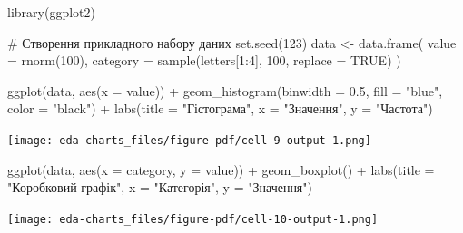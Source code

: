 \documentclass[
  letterpaper,
  DIV=11,
  numbers=noendperiod]{scrreprt}
\newenvironment{Shaded}{\begin{snugshade}}{\end{snugshade}}
\newcommand{\AttributeTok}[1]{\textcolor[rgb]{0.40,0.45,0.13}{#1}}
\newcommand{\CommentTok}[1]{\textcolor[rgb]{0.37,0.37,0.37}{#1}}
\newcommand{\ConstantTok}[1]{\textcolor[rgb]{0.56,0.35,0.01}{#1}}
\newcommand{\DecValTok}[1]{\textcolor[rgb]{0.68,0.00,0.00}{#1}}
\newcommand{\FloatTok}[1]{\textcolor[rgb]{0.68,0.00,0.00}{#1}}
\newcommand{\FunctionTok}[1]{\textcolor[rgb]{0.28,0.35,0.67}{#1}}
\newcommand{\NormalTok}[1]{\textcolor[rgb]{0.00,0.23,0.31}{#1}}
\newcommand{\OtherTok}[1]{\textcolor[rgb]{0.00,0.23,0.31}{#1}}
\newcommand{\SpecialCharTok}[1]{\textcolor[rgb]{0.37,0.37,0.37}{#1}}
\newcommand{\StringTok}[1]{\textcolor[rgb]{0.13,0.47,0.30}{#1}}
\begin{document}
\begin{Shaded}
\begin{Highlighting}[]
\FunctionTok{library}\NormalTok{(ggplot2)}

\CommentTok{\# Створення прикладного набору даних}
\FunctionTok{set.seed}\NormalTok{(}\DecValTok{123}\NormalTok{)}
\NormalTok{data }\OtherTok{\textless{}{-}} \FunctionTok{data.frame}\NormalTok{(}
  \AttributeTok{value =} \FunctionTok{rnorm}\NormalTok{(}\DecValTok{100}\NormalTok{),}
  \AttributeTok{category =} \FunctionTok{sample}\NormalTok{(letters[}\DecValTok{1}\SpecialCharTok{:}\DecValTok{4}\NormalTok{], }\DecValTok{100}\NormalTok{, }\AttributeTok{replace =} \ConstantTok{TRUE}\NormalTok{)}
\NormalTok{)}
\end{Highlighting}
\end{Shaded}

\begin{Shaded}
\begin{Highlighting}[]
\FunctionTok{ggplot}\NormalTok{(data, }\FunctionTok{aes}\NormalTok{(}\AttributeTok{x =}\NormalTok{ value)) }\SpecialCharTok{+}
  \FunctionTok{geom\_histogram}\NormalTok{(}\AttributeTok{binwidth =} \FloatTok{0.5}\NormalTok{, }\AttributeTok{fill =} \StringTok{"blue"}\NormalTok{, }\AttributeTok{color =} \StringTok{"black"}\NormalTok{) }\SpecialCharTok{+}
  \FunctionTok{labs}\NormalTok{(}\AttributeTok{title =} \StringTok{"Гістограма"}\NormalTok{, }\AttributeTok{x =} \StringTok{"Значення"}\NormalTok{, }\AttributeTok{y =} \StringTok{"Частота"}\NormalTok{)}
\end{Highlighting}
\end{Shaded}

\texttt{[image: eda-charts\_files/figure-pdf/cell-9-output-1.png]}

\begin{Shaded}
\begin{Highlighting}[]
\FunctionTok{ggplot}\NormalTok{(data, }\FunctionTok{aes}\NormalTok{(}\AttributeTok{x =}\NormalTok{ category, }\AttributeTok{y =}\NormalTok{ value)) }\SpecialCharTok{+}
  \FunctionTok{geom\_boxplot}\NormalTok{() }\SpecialCharTok{+}
  \FunctionTok{labs}\NormalTok{(}\AttributeTok{title =} \StringTok{"Коробковий графік"}\NormalTok{, }\AttributeTok{x =} \StringTok{"Категорія"}\NormalTok{, }\AttributeTok{y =} \StringTok{"Значення"}\NormalTok{)}
\end{Highlighting}
\end{Shaded}

\texttt{[image: eda-charts\_files/figure-pdf/cell-10-output-1.png]}
\end{document}
